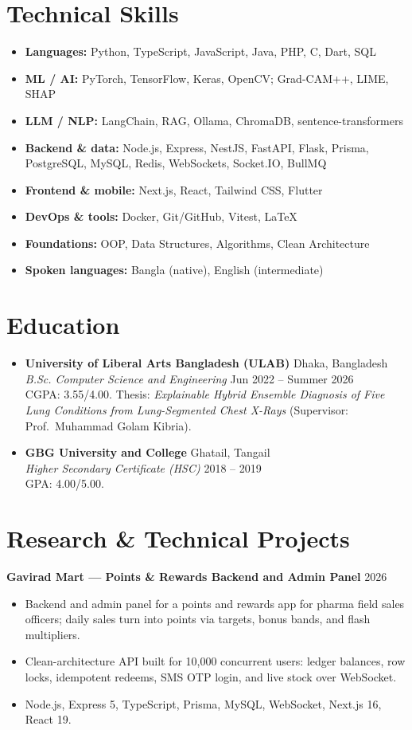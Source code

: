 \documentclass[letterpaper,11pt]{article}
\newcommand{\role}[4]{\item \textbf{#1} \hfill #2 \\ \textit{#3} \hfill #4}
\newcommand{\project}[2]{\vspace{3pt}\textbf{#1} \hfill #2 \\[-2pt]}
\begin{document}
\section{Technical Skills}
\begin{itemize}
    \item \textbf{Languages:} Python, TypeScript, JavaScript, Java, PHP, C, Dart, SQL
    \item \textbf{ML / AI:} PyTorch, TensorFlow, Keras, OpenCV; Grad-CAM++, LIME, SHAP
    \item \textbf{LLM / NLP:} LangChain, RAG, Ollama, ChromaDB, sentence-transformers
    \item \textbf{Backend \& data:} Node.js, Express, NestJS, FastAPI, Flask, Prisma, PostgreSQL, MySQL, Redis, WebSockets, Socket.IO, BullMQ
    \item \textbf{Frontend \& mobile:} Next.js, React, Tailwind CSS, Flutter
    \item \textbf{DevOps \& tools:} Docker, Git/GitHub, Vitest, LaTeX
    \item \textbf{Foundations:} OOP, Data Structures, Algorithms, Clean Architecture
    \item \textbf{Spoken languages:} Bangla (native), English (intermediate)
\end{itemize}

\section{Education}
\begin{itemize}
    \role{University of Liberal Arts Bangladesh (ULAB)}{Dhaka, Bangladesh}{B.Sc. Computer Science and Engineering}{Jun 2022 -- Summer 2026}
    \\ CGPA: 3.55/4.00. Thesis: \textit{Explainable Hybrid Ensemble Diagnosis of Five Lung Conditions from Lung-Segmented Chest X-Rays} (Supervisor: Prof.\ Muhammad Golam Kibria).
    \role{GBG University and College}{Ghatail, Tangail}{Higher Secondary Certificate (HSC)}{2018 -- 2019}
    \\ GPA: 4.00/5.00.
\end{itemize}

\section{Research \& Technical Projects}

\project{Gavirad Mart --- Points \& Rewards Backend and Admin Panel}{2026}
\begin{itemize}[label=$\circ$]
    \item Backend and admin panel for a points and rewards app for pharma field sales officers; daily sales turn into points via targets, bonus bands, and flash multipliers.
    \item Clean-architecture API built for 10,000 concurrent users: ledger balances, row locks, idempotent redeems, SMS OTP login, and live stock over WebSocket.
    \item Node.js, Express 5, TypeScript, Prisma, MySQL, WebSocket, Next.js 16, React 19.
\end{itemize}
\end{document}
